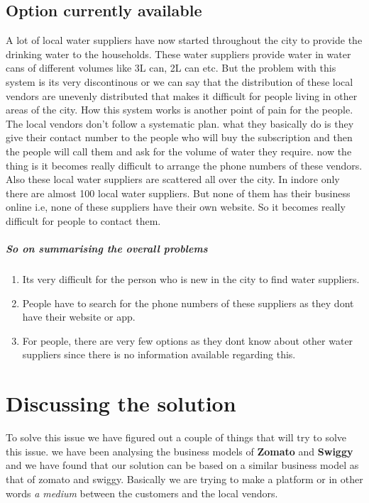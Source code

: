 \documentclass[a4paper, 12pt]{report}
\begin{document}
\subsection[short]{Option currently available}
A lot of local water suppliers have now started throughout the city to provide the drinking water to the households. These water suppliers provide water in water cans 
of different volumes like 3L can, 2L can etc. But the problem with this system is its very discontinous or we can say that the distribution of these local vendors are
unevenly distributed that makes it difficult for people living in other areas of the city. How this system works is another point of pain for the people. The local vendors
don't follow a systematic plan. what they basically do is they give their contact number to the people who will buy the subscription and then the people will call them and
ask for the volume of water they require. now the thing is it becomes really difficult to arrange the phone numbers of these vendors. Also these local water suppliers are scattered all over the city. In indore only there are almost 100 local water suppliers. But none of them has their business online i.e, none of these suppliers have their own website. So it becomes really difficult for people to contact them.
\subparagraph*{So on summarising the overall problems}

\begin{enumerate}
    \item Its very difficult for the person who is new in the city to find water suppliers.
    \item People have to search for the phone numbers of these suppliers as they dont have their website or app.
    \item For people, there are very few options as they dont know about other water suppliers since there is no information available regarding this.
\end{enumerate}

\section*{Discussing the solution}
To solve this issue we have figured out a couple of things that will try to solve this issue. we have been analysing the business
models of \textbf{Zomato} and \textbf{Swiggy} and we have found that our solution can be based on a similar business model as that 
of zomato and swiggy. Basically we are trying to make a platform or in other words \textit{a medium} between the customers and the 
local vendors.
\end{document}
